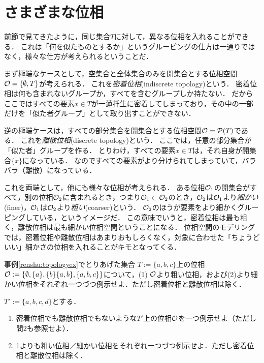 \documentclass[11pt,a4paper, dvipdfmx]{jsarticle}
\begin{document}
\section{さまざまな位相}
前節で見てきたように，同じ集合$T$に対して，異なる位相を入れることができる．
これは「何を似たものとするか」というグルーピングの仕方は一通りではなく，様々な仕方が考えられるということだ．

まず極端なケースとして，空集合と全体集合のみを開集合とする位相空間$\mathcal{O} = \{\emptyset, T\}$が考えられる．
これを\emph{密着位相}(indiscrete topology)という．
密着位相は何も含まれないグループか，すべてを含むグループしか持たない．
だからここではすべての要素$x \in T$が一蓮托生に密着してしまっており，その中の一部だけを「似た者グループ」として取り出すことができない．

逆の極端ケースは，すべての部分集合を開集合とする位相空間$\mathcal{O} = \mathcal{P}(T)$である．
これを\emph{離散位相}(discrete topology)という．
ここでは，任意の部分集合が「似た者」グループを作る．
とりわけ，すべての要素$x \in T$は，それ自身が開集合$\{x\}$になっている．
なのですべての要素がより分けられてしまっていて，バラバラ（離散）になっている．

これを両端として，他にも様々な位相が考えられる．
ある位相$\mathcal{O}_1$の開集合がすべて，別の位相$\mathcal{O}_2$に含まれるとき，つまり$\mathcal{O}_1 \subset \mathcal{O}_2$のとき，$\mathcal{O}_2$は$\mathcal{O}_1$より\emph{細かい}(finer)，$\mathcal{O}_1$は$\mathcal{O}_2$より\emph{粗い}(coarser)という．
$\mathcal{O}_2$のほうが要素をより細かくグルーピングしている，というイメージだ．
この意味でいうと，密着位相は最も粗く，離散位相は最も細かい位相空間ということになる．
位相空間のモデリングでは，密着位相や離散位相はあまりおもしろくなく，対象に合わせた「ちょうどいい」細かさの位相を入れることがキモとなってくる．

\begin{renshu}{}{}
事例\ref{renshu:topologyex}でとりあげた集合 $T:=\{a, b, c\}$上の位相$\mathcal{O} := \{ \emptyset, \{a \}, \{b\} \{a,b\}, \{a,b,c\} \}$について，(1) $\mathcal{O}$より粗い位相，および(2)より細かい位相をそれぞれ一つづつ例示せよ．ただし密着位相と離散位相は除く．
\end{renshu}


\begin{renshu}{}{}
$T':=\{a, b, c, d\}$とする．
\begin{enumerate}
 \item 密着位相でも離散位相でもないような$T'$上の位相$\mathcal{O}$を一つ例示せよ（ただし問2も参照せよ）．
 \item 1よりも粗い位相／細かい位相をそれぞれ一つづつ例示せよ．ただし密着位相と離散位相は除く．
\end{enumerate}
\end{renshu}
\end{document}
